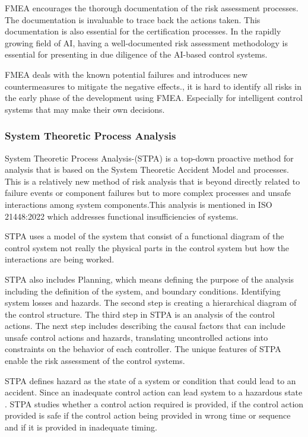 {FMEA encourages the thorough documentation of the risk assessment processes. The documentation is invaluable to trace back the actions taken. This documentation is also essential for the certification processes. In the rapidly growing field of AI, having a well-documented risk assessment methodology is essential for presenting in due diligence of the AI-based control systems.

FMEA deals with the known potential failures and introduces new countermeasures to mitigate the negative effects., it is hard to identify all risks in the early phase of the development using FMEA. Especially for intelligent control systems that may make their own decisions.



\subsubsection{\RaggedRight System Theoretic Process Analysis }

System Theoretic Process Analysis-(STPA) is a top-down proactive method for analysis that is based on the System Theoretic Accident Model and processes. This is a relatively new method of risk analysis that is beyond directly related to failure events or component failures but to more complex processes and unsafe interactions among system components.This analysis is mentioned in ISO 21448:2022 which addresses functional insufficiencies of systems.

STPA uses a model of the system that consist of a functional diagram of the control system not really the physical parts in the control system but how the interactions are being worked.

STPA also includes Planning, which means defining the purpose of the analysis including the definition of the system, and boundary conditions. Identifying system losses and hazards. The second step is creating a hierarchical diagram of the control structure. The third step in STPA is an analysis of the control actions. The next step includes describing the causal factors that can include unsafe control actions and hazards, translating uncontrolled actions into constraints on the behavior of each controller. The unique features of STPA enable the risk assessment of the control systems.

STPA defines hazard as the state of a system or condition that could lead to an accident. Since an inadequate control action can lead system to a hazardous state . STPA studies whether a control action required is provided, if the control action provided is safe if the control action being provided in wrong time or sequence and if it is provided in inadequate timing.

}
